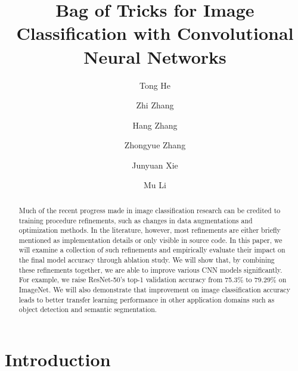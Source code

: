 \documentclass[10pt,twocolumn,letterpaper]{article}
\begin{document}
\title{Bag of Tricks for Image Classification with Convolutional Neural Networks}

\iffalse
\author{
Tong He\\
{\tt\small htong@amazon.com}
\and
Zhi Zhang\\
{\tt\small zhiz@amazon.com}
\and
Hang Zhang\\
{\tt\small hzaws@amazon.com}
\and
Zhongyue Zhang\\
{\tt\small zhongyue@amazon.com}
\and
Junyuan Xie\\
{\tt\small junyuanx@amazon.com}\and
Mu Li\\
{\tt\small mli@amazon.com}
}
\fi

\author[ ]{
Tong He
}
\author[ ]{
\; Zhi Zhang
}
\author[ ]{
\; Hang Zhang
}
\author[ ]{
\; Zhongyue Zhang
}
\author[ ]{
\; Junyuan Xie
}
\author[ ]{
\; Mu Li
}

\renewcommand\Authsep{  } 
\renewcommand\Authands{  }

\maketitle


\begin{abstract}

Much of the recent progress made in image classification research can be credited to training procedure refinements, 
such as changes in data augmentations and optimization methods.
In the literature, however, most refinements are either briefly mentioned as implementation details or only visible in source code.
In this paper, we will examine a collection of such refinements and empirically
evaluate their impact on the final model accuracy through ablation study. We
will show that, by combining these refinements together, we are able to improve various CNN models significantly.
For example, we raise ResNet-50's top-1 validation accuracy from
75.3\% to 79.29\% on ImageNet.
We will also demonstrate that improvement on image classification accuracy leads to better transfer learning performance in
other application domains such as object detection and semantic segmentation.
\end{abstract}

\section{Introduction}
\end{document}
